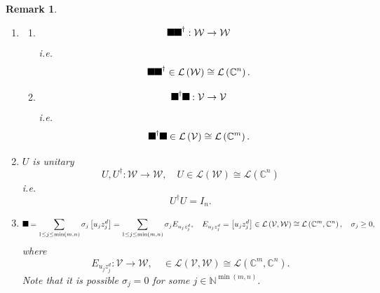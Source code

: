 \documentclass[aps,preprint]{revtex4}%
\providecommand{\U}[1]{\protect\rule{.1in}{.1in}}
\newtheorem{remark}[theorem]{Remark}
\begin{document}
\begin{remark}
\begin{enumerate}
\item
\begin{enumerate}
\item
\begin{equation}
\U{3a3} \U{3a3} ^{\dagger}:\mathcal{W\rightarrow W}%
\end{equation}
i.e.%
\begin{equation}
\U{3a3} \U{3a3} ^{\dagger}\in\mathcal{L}\left(  \mathcal{W}\right)
\cong\mathcal{L}\left(  \mathbb{C}^{n}\right)  .
\end{equation}


\item
\begin{equation}
\U{3a3} ^{\dagger}\U{3a3} :\mathcal{V\rightarrow V}%
\end{equation}
i.e.%
\begin{equation}
\U{3a3} ^{\dagger}\U{3a3} \in\mathcal{L}\left(  \mathcal{V}\right)
\cong\mathcal{L}\left(  \mathbb{C}^{m}\right)  .
\end{equation}

\end{enumerate}

\item $U$ is unitary%
\begin{equation}
U,U^{\dagger}:\mathcal{W\rightarrow W},\quad U\in\mathcal{L}\left(
\mathcal{W}\right)  \cong\mathcal{L}\left(  \mathbb{C}^{n}\right)
\end{equation}
i.e.
\begin{equation}
U^{\dagger}U=I_{n}.
\end{equation}


\item
\begin{equation}
\U{3a3} =\sum_{1\leq j\leq\min\left(  m,n\right)  }\sigma_{j}\left[
u_{j}z_{j}^{d}\right]  =\sum_{1\leq j\leq\min\left(  m,n\right)  }\sigma
_{j}E_{u_{j}z_{j}^{d}},\quad E_{u_{j}z_{j}^{d}}=\left[  u_{j}z_{j}^{d}\right]
\in\mathcal{L}\left(  \mathcal{V},\mathcal{W}\right)  \cong\mathcal{L}\left(
\mathbb{C}^{m},\mathbb{C}^{n}\right)  ,\quad\sigma_{j}\geq0,
\end{equation}
where
\begin{equation}
E_{u_{j}z_{j}^{d}}:\mathcal{V}\rightarrow\mathcal{W},\quad\in\mathcal{L}%
\left(  \mathcal{V},\mathcal{W}\right)  \cong\mathcal{L}\left(  \mathbb{C}%
^{m},\mathbb{C}^{n}\right)  .
\end{equation}
Note that it is possible $\sigma_{j}=0$ for some $j\in\mathbb{N}^{\min\left(
m,n\right)  }.$


\end{enumerate}
\end{remark}
\end{document}

